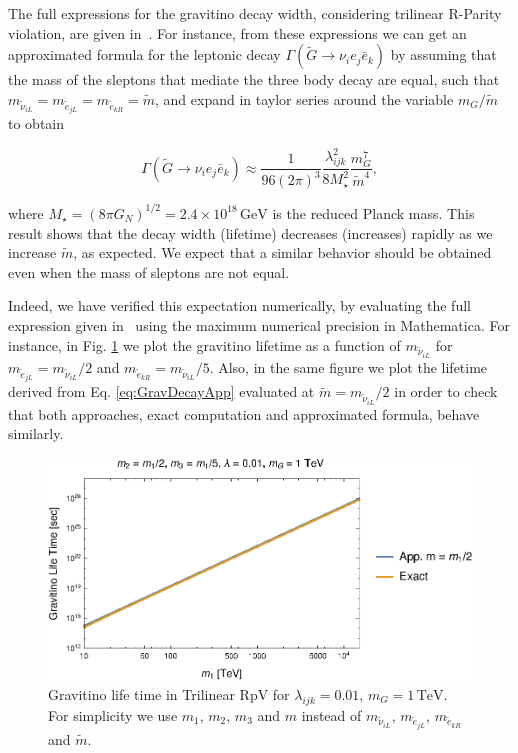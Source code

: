 \documentclass[a4paper,11pt]{article}
\begin{document}
The full expressions for the gravitino decay width, considering trilinear
R-Parity violation, are given in~\cite{Moreau:2001sr}. For instance, from
these expressions we can get an approximated formula for the leptonic
decay $\Gamma(\tilde{G}\rightarrow\nu_{i}e_{j}\bar{e}_{k})$ by assuming
that the mass of the sleptons that mediate the three body decay are
equal, such that $m_{\tilde{\nu}_{iL}}=m_{\tilde{e}_{jL}}=m_{\tilde{e}_{kR}}=\tilde{m}$,
and expand in taylor series around the variable $m_{G}/\tilde{m}$
to obtain

\begin{equation}
\Gamma(\tilde{G}\rightarrow\nu_{i}e_{j}\bar{e}_{k})\approx\frac{1}{96(2\pi)^{3}}\frac{\lambda_{ijk}^{2}}{8M_{\star}^{2}}\frac{m_{G}^{7}}{\tilde{m}^{4}},\label{eq:GravDecayApp}
\end{equation}


\noindent where $M_{\star}=(8\pi G_{N})^{1/2}=2.4\times10^{18}\,\mbox{GeV}$
is the reduced Planck mass. This result shows that the decay width
(lifetime) decreases (increases) rapidly as we increase $\tilde{m}$,
as expected. We expect that a similar behavior should be obtained
even when the mass of sleptons are not equal.

Indeed, we have verified this expectation numerically, by evaluating
the full expression given in~\cite{Moreau:2001sr} using the maximum numerical
precision in Mathematica. For instance, in Fig. \ref{fig:Gravitino-life-time}
we plot the gravitino lifetime as a function of $m_{\tilde{\nu}_{iL}}$
for $m_{\tilde{e}_{jL}}=m_{\tilde{\nu}_{iL}}/2$ and $m_{\tilde{e}_{kR}}=m_{\tilde{\nu}_{iL}}/5$.
Also, in the same figure we plot the lifetime derived from Eq. \ref{eq:GravDecayApp}
evaluated at $\tilde{m}=m_{\tilde{\nu}_{iL}}/2$ in order to check
that both approaches, exact computation and approximated formula,
behave similarly.

\begin{figure}
\begin{centering}
\includegraphics[scale=1.2]{GravitinoDecaym1m2m3Final}
\par\end{centering}

\caption{\label{fig:Gravitino-life-time}Gravitino life time in Trilinear RpV
for $\lambda_{ijk}=0.01,\,m_{G}=1\,\mbox{TeV}$. For simplicity we
use $m_{1},\,m_{2},\,m_{3}$ and $m$ instead of $m_{\tilde{\nu}_{iL}},\,m_{\tilde{e}_{jL}},\,m_{\tilde{e}_{kR}}$
and $\tilde{m}$.}
\end{figure}
\end{document}
